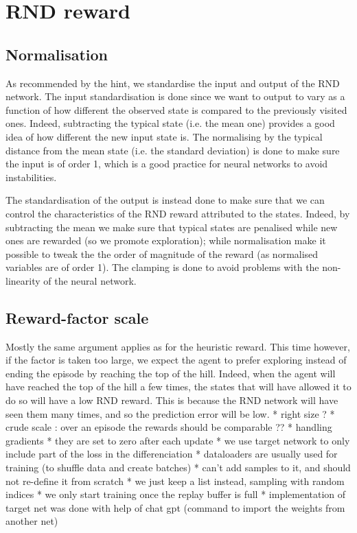 \documentclass[a4paper, 12pt,oneside]{article}
\begin{document}
        \section{RND reward}
            \subsection{Normalisation} 
            As recommended by the hint, we standardise the input and output of the RND network. The input standardisation is done since we want to output to vary as a function of how different the observed state is compared to the previously visited ones. Indeed, subtracting the typical state (i.e. the mean one) provides a good idea of how different the new input state is. The normalising by the typical distance from the mean state (i.e. the standard deviation) is done to make sure the input is of order 1, which is a good practice for neural networks to avoid instabilities.
            
            The standardisation of the output is instead done to make sure that we can control the characteristics of the RND reward attributed to the states. Indeed, by subtracting the mean we make sure that typical states are penalised  while new ones are rewarded (so we promote exploration); while normalisation make it possible to tweak the the order of magnitude of the reward (as normalised variables are of order 1). The clamping is done to avoid problems with the non-linearity of the neural network. 
            \subsection{Reward-factor scale}
            Mostly the same argument applies as for the heuristic reward. This time however, if the factor is taken too large, we expect the agent to prefer exploring instead of ending the episode by reaching the top of the hill. Indeed, when the agent will have reached the top of the hill a few times, the states that will have allowed it to do so will have a low RND reward. This is because the RND network will have seen them many times, and so the prediction error will be low.
            * right size ?
            * crude scale : over an episode the rewards should be comparable ?? 
            * handling gradients 
            * they are set to zero after each update
            * we use target network to only include part of the loss in the differenciation 
          * dataloaders are usually used for training (to shuffle data and create batches)
            * can't add samples to it, and should not re-define it from scratch 
              * we just keep a list instead, sampling with random indices 
          * we only start training once the replay buffer is full 
          * implementation of target net was done with help of chat gpt (command to import the weights from another net)
\end{document}
